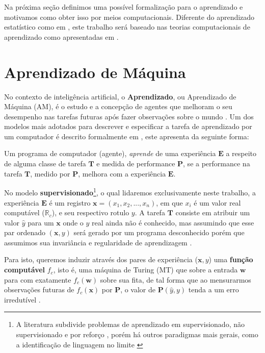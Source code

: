 Na próxima seção definimos uma possível formalização para o aprendizado e motivamos como
obter isso por meios computacionais. Diferente do aprendizado estatístico como em \cite{friedman2001elements}, este trabalho será baseado nas teorias computacionais de
aprendizado como apresentadas em
\cite{valiant1984theory,gold1967language,kearns1994introduction}.

\section{Aprendizado de Máquina}
\label{sec:aprendizado-de-maquina}

No contexto de inteligência artificial, o \textbf{Aprendizado}, ou Aprendizado
de Máquina (AM), é o estudo e a concepção de agentes que melhoram o seu
desempenho nas tarefas futuras após fazer observações sobre o mundo
\cite{russell2016artificial, mohri2018foundations}. Um dos modelos mais adotados
para descrever e especificar a tarefa de aprendizado por um computador é
descrito formalmente em \cite{mitchell1997machine}, este apresenta da seguinte
forma:

\begin{definition}
Um programa de computador (agente), \textit{aprende} de uma experiência
$\boldsymbol E$ a respeito de alguma classe de tarefa $\boldsymbol T$ e medida
de performance $\boldsymbol P$, se a performance na tarefa $\boldsymbol T$,
medido por $\boldsymbol P$, melhora com a experiência $\boldsymbol E$.
\end{definition}

No modelo \textbf{supervisionado}\footnote{A literatura subdivide problemas de
aprendizado em supervisionado, não supervisionado e por reforço
\cite{russell2016artificial,friedman2001elements,goodfellow2016deep},
porém há outros paradigmas mais gerais, como a identificação de linguagem no
limite \cite{gold1967language}}, o qual lidaremos exclusivamente neste
trabalho, a experiência $\boldsymbol E$ é um registro
$\boldsymbol{x}=(x_1,x_2,...,x_n)$, em que $x_i$ é um valor real computável
($\mathbb{R}_c$), e seu respectivo rotulo $y$. A tarefa $\boldsymbol T$
consiste em atribuir um valor $\hat{y}$ para um $\boldsymbol{x}$ onde o $y$
real ainda não é conhecido, mas assumindo que esse par ordenado
$(\boldsymbol{x},y)$ será gerado por um programa desconhecido porém que
assumimos sua invariância e regularidade de aprendizagem
\cite{mohri2018foundations,valiant1984theory}.

Para isto, queremos induzir através dos pares de experiência
($\boldsymbol{x},y$) uma \textbf{função computável} $f_c$, isto é, uma máquina
de Turing (MT) que sobre a entrada $\boldsymbol{w}$ para com exatamente
$f_c(\boldsymbol{w})$ sobre sua fita, de tal forma que ao mensurarmos
observações futuras de $f_c(\boldsymbol{x})$ por $\boldsymbol P$, o valor de
$\boldsymbol{P}(\hat{y},y)$ tenda a um erro irredutível
\cite{mohri2018foundations,mitchell1997machine,friedman2001elements}.

